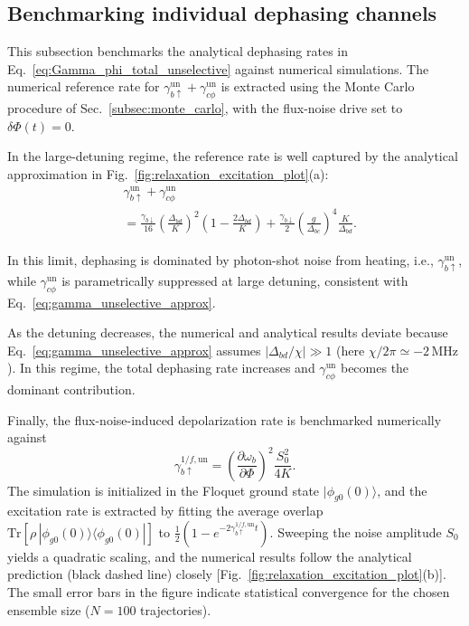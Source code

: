 \subsection{Benchmarking individual dephasing channels}
\label{subsec:check_individual}

This subsection benchmarks the analytical dephasing rates in Eq.~\eqref{eq:Gamma_phi_total_unselective} against numerical simulations. The numerical reference rate for
\(\gamma_{b\uparrow}^{\mathrm{un}}+\gamma_{c\phi}^{\mathrm{un}}\) is extracted using the Monte Carlo procedure of Sec.~\ref{subsec:monte_carlo}, with the flux-noise drive set to \(\delta\Phi(t)=0\).

In the large-detuning regime, the reference rate is well captured by the analytical approximation in Fig.~\ref{fig:relaxation_excitation_plot}(a):
\begin{align}
&\gamma_{b\uparrow}^{\mathrm{un}}+\gamma_{c\phi}^{\mathrm{un}}\\
&=
\frac{\gamma_{b\downarrow}}{16}\left(\frac{\Delta_{bd}}{K}\right)^2
\left(1-\frac{2\Delta_{bd}}{K}\right)
+\frac{\gamma_{b\downarrow}}{2}\left(\frac{g}{\Delta_{bc}}\right)^4\frac{K}{\Delta_{bd}} .
\label{eq:gamma_unselective_approx}
\end{align}

In this limit, dephasing is dominated by photon-shot noise from heating, i.e., \(\gamma_{b\uparrow}^{\mathrm{un}}\), while \(\gamma_{c\phi}^{\mathrm{un}}\) is parametrically suppressed at large detuning, consistent with Eq.~\eqref{eq:gamma_unselective_approx}.

As the detuning decreases, the numerical and analytical results deviate because Eq.~\eqref{eq:gamma_unselective_approx} assumes \(|\Delta_{bd}/\chi|\gg 1\) (here \(\chi/2\pi \simeq -2\,\mathrm{MHz}\)). In this regime, the total dephasing rate increases and \(\gamma_{c\phi}^{\mathrm{un}}\) becomes the dominant contribution.

Finally, the flux-noise-induced depolarization rate is benchmarked numerically against
\begin{equation}
\gamma_{b\uparrow}^{1/f,\mathrm{un}}=
\left(\frac{\partial\omega_b}{\partial\Phi}\right)^2\frac{S_0^2}{4K}.
\end{equation}
The simulation is initialized in the Floquet ground state \(|\phi_{g0}(0)\rangle\), and the excitation rate is extracted by fitting the average overlap
\(\mathrm{Tr}\!\left[\rho\,|\phi_{g0}(0)\rangle\langle\phi_{g0}(0)|\right]\) to \(\frac{1}{2}\!\left(1-e^{-2\gamma_{b\uparrow}^{1/f,\mathrm{un}} t}\right)\).
Sweeping the noise amplitude \(S_0\) yields a quadratic scaling, and the numerical results follow the analytical prediction (black dashed line) closely [Fig.~\ref{fig:relaxation_excitation_plot}(b)]. The small error bars in the figure indicate statistical convergence for the chosen ensemble size ($N=100$ trajectories).

